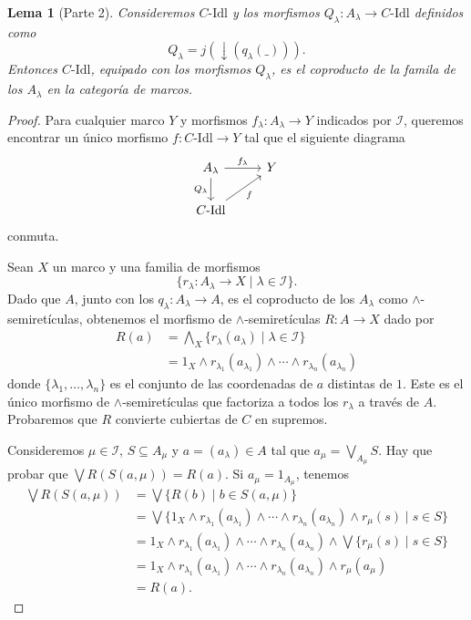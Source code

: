\documentclass[12pt,letterpaper,titlepage]{article}
\newtheorem*{lemma}{Lema}
\theoremstyle{definition}
\newcommand\Sup{\bigvee}
\newcommand\down{{\downarrow}}
\renewcommand\inf{\wedge}
\newcommand\Inf{\bigwedge}
\newcommand\scr[1]{\mathscr{#1}}
\newcommand\<{\langle}
\renewcommand\>{\rangle}
\newcommand\Idl{\text{-}\mathrm{Idl}}
\begin{document}
\begin{lemma}[Parte 2]
    Consideremos $C\Idl$ y los morfismos
    $Q_\lambda\colon A_\lambda\to C\Idl$
    definidos como
    \[
        Q_\lambda=j(\down(q_\lambda(\_)))
    .\]
    Entonces $C\Idl$, equipado con los morfismos $Q_\lambda$,
    es el coproducto de la famila de los $A_\lambda$
    en la categoría de marcos.
\end{lemma}
\begin{proof}
Para cualquier marco $Y$ y morfismos
$f_\lambda\colon A_\lambda\to Y$ indicados por $\scr I$,
queremos encontrar un único morfismo
$f\colon C\Idl\to Y$ tal que el siguiente diagrama
\[
    \begin{tikzcd}
        A_\lambda
            \ar[d,"Q_\lambda"']
            \ar[r,"f_\lambda"]
        & Y \\
        C\Idl \ar[ru,"f"']
    \end{tikzcd}
\]
conmuta.

Sean $X$ un marco y una familia de morfismos
\[\{r_\lambda\colon A_\lambda\to X\mid \lambda\in \scr I\}.\]
Dado que $A$, junto con los $q_\lambda:A_\lambda\to A$,
es el coproducto de los $A_\lambda$ como $\inf$-semiretículas,
obtenemos el morfismo de $\inf$-semiretículas
$R\colon A\to X$ dado por
\begin{align*}
    R(a)
    &=\Inf_X \{r_\lambda(a_\lambda)\mid \lambda\in\scr I\} \\
    &= 1_X\inf r_{\lambda_1}(a_{\lambda_1})\inf\cdots\inf r_{\lambda_n}(a_{\lambda_n})
\end{align*}
donde $\{\lambda_1,\dots,\lambda_n\}$ es el conjunto
de las coordenadas de $a$ distintas de $1$.
Este es el único morfismo de $\inf$-semiretículas que
factoriza a todos los $r_\lambda$ a través de $A$.
Probaremos que $R$ convierte cubiertas de $C$ en supremos.

Consideremos $\mu\in\scr I$, $S\subseteq A_\mu$ y $a=(a_\lambda)\in A$ tal que $a_\mu=\Sup_{A_\mu} S$.
Hay que probar que $\Sup R(S(a,\mu)) = R(a)$.
Si $a_\mu= 1_{A_\mu}$, tenemos
\begin{align*}
    \Sup R(S(a,\mu))
    &= \Sup\{R(b) \mid b\in S(a,\mu)\} \\
    &= \Sup\{ 1_X\inf r_{\lambda_1}(a_{\lambda_1})\inf
        \cdots\inf r_{\lambda_n}(a_{\lambda_n}) \inf r_\mu(s) \mid s\in S\} \\
    &= 1_X\inf r_{\lambda_1}(a_{\lambda_1})\inf
        \cdots\inf r_{\lambda_n}(a_{\lambda_n}) \inf
        \Sup\{ r_\mu(s) \mid s\in S\} \\
    &= 1_X\inf r_{\lambda_1}(a_{\lambda_1})\inf
        \cdots\inf r_{\lambda_n}(a_{\lambda_n}) \inf
        r_\mu(a_\mu) \\
    &= R(a).
\end{align*}


\end{proof}
\end{document}
